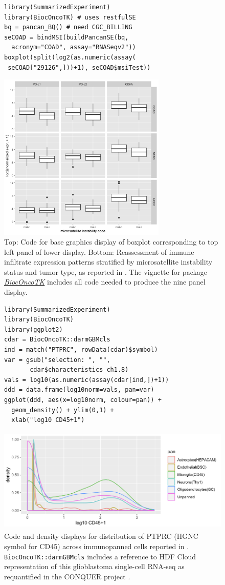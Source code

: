 \documentclass[applications]{gen-bioinformatics}
\newcommand{\Biocpackage}[1]{{\emph{\href{https://bioconductor.org/packages/3.8/#1}{#1}}}}
\begin{document}
\begin{figure}[bb]
\begin{verbatim}
library(SummarizedExperiment)
library(BiocOncoTK) # uses restfulSE
bq = pancan_BQ() # need CGC_BILLING
seCOAD = bindMSI(buildPancanSE(bq, 
  acronym="COAD", assay="RNASeqv2"))
boxplot(split(log2(as.numeric(assay(
 seCOAD["29126",]))+1), seCOAD$msiTest))
\end{verbatim}
\includegraphics[height=8.0cm]{imm3x3.png}
\caption{Top: Code for base graphics display of boxplot
corresponding to top left panel of lower display.
Bottom: Reassessment of immune infiltrate expression
patterns stratified by microsatellite instability
status and tumor type, as reported in \cite{Bailey2018}.
The vignette for package \Biocpackage{BiocOncoTK} \citep{bionc} includes all
code needed to produce the nine panel display.}
\label{pancanPanel}
\end{figure}



\begin{figure}[bb]
\begin{verbatim}
library(SummarizedExperiment)
library(BiocOncoTK)
library(ggplot2)
cdar = BiocOncoTK::darmGBMcls
ind = match("PTPRC", rowData(cdar)$symbol)
var = gsub("selection: ", "", 
       cdar$characteristics_ch1.8)
vals = log10(as.numeric(assay(cdar[ind,])+1))
ddd = data.frame(log10norm=vals, pan=var)
ggplot(ddd, aes(x=log10norm, colour=pan)) + 
  geom_density() + ylim(0,1) + 
  xlab("log10 CD45+1")
\end{verbatim}
\includegraphics[height=5.0cm]{darmDens.png}
\caption{Code and density displays for
distribution of PTPRC (HGNC symbol for CD45) across immunopanned
cells reported in \cite{Darmanis2017}.
\texttt{BiocOncoTK::darmGBMcls} includes
a reference to HDF Cloud representation of
this glioblastoma single-cell RNA-seq
as requantified in the CONQUER project \citep{Soneson2018}.}
\label{hdffig}
\end{figure}
\end{document}
